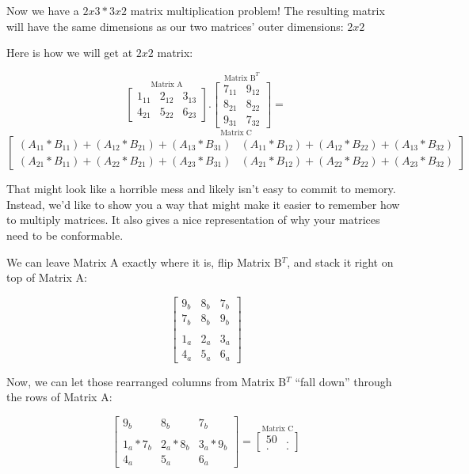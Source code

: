 \documentclass[
  letterpaper,
]{krantz}
\begin{document}
Now we have a \(2x3 * 3x2\) matrix multiplication problem! The resulting
matrix will have the same dimensions as our two matrices' outer
dimensions: \(2x2\)

Here is how we will get at \(2x2\) matrix:

\[
\stackrel{\mbox{Matrix A}}{
\begin{bmatrix}
1_{11} & 2_{12} & 3_{13}\\
4_{21} & 5_{22} & 6_{23}
\end{bmatrix}
}
.
\stackrel{\mbox{Matrix B}^T}{
\begin{bmatrix}
7_{11} & 9_{12} \\ 
8_{21}& 8_{22}\\
9_{31} & 7_{32}
\end{bmatrix} 
}
=
\] \[
\stackrel{\mbox{Matrix C}}{
\begin{bmatrix}
(A_{11}*B_{11})+(A_{12}*B_{21})+(A_{13}*B_{31}) & (A_{11}*B_{12})+(A_{12}*B_{22})+(A_{13}*B_{32}) \\
(A_{21}*B_{11})+(A_{22}*B_{21})+(A_{23}*B_{31}) & (A_{21}*B_{12})+(A_{22}*B_{22})+(A_{23}*B_{32})
\end{bmatrix} 
}
\]

That might look like a horrible mess and likely isn't easy to commit to
memory. Instead, we'd like to show you a way that might make it easier
to remember how to multiply matrices. It also gives a nice
representation of why your matrices need to be conformable.

We can leave Matrix A exactly where it is, flip Matrix B\(^T\), and
stack it right on top of Matrix A:

\[
\begin{bmatrix}
9_{b} & 8_{b} & 7_{b} \\
7_{b} & 8_{b} & 9_{b} \\
\\
1_{a} & 2_{a} & 3_{a} \\
4_{a} & 5_{a} & 6_{a}
\end{bmatrix}
\]

Now, we can let those rearranged columns from Matrix B\(^T\) ``fall
down'' through the rows of Matrix A:

\[
\begin{bmatrix}
9_{b} & 8_{b} & 7_{b} \\
\\
1_{a}*7_{b} & 2_{a}*8_{b} & 3_{a}*9_{b}\\
4_{a} & 5_{a} & 6_{a}
\end{bmatrix}
= 
\stackrel{\mbox{Matrix C}}{
\begin{bmatrix}
50 & .\\
. & .
\end{bmatrix}
}
\]
\end{document}
